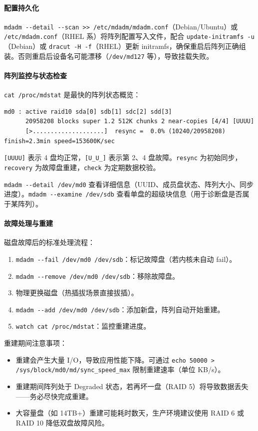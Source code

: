 \documentclass[12pt,UTF8]{ctexbook}
\begin{document}
\paragraph{配置持久化}

\verb|mdadm --detail --scan >> /etc/mdadm/mdadm.conf|（Debian/Ubuntu）或 \verb|/etc/mdadm.conf|（RHEL 系）将阵列配置写入文件，配合 \verb|update-initramfs -u|（Debian）或 \verb|dracut -H -f|（RHEL）更新 initramfs，确保重启后阵列正确组装。否则重启后设备名可能漂移（\verb|/dev/md127| 等），导致挂载失败。

\paragraph{阵列监控与状态检查}

\verb|cat /proc/mdstat| 是最快的阵列状态概览：
\begin{verbatim}
md0 : active raid10 sda[0] sdb[1] sdc[2] sdd[3]
      20958208 blocks super 1.2 512K chunks 2 near-copies [4/4] [UUUU]
      [>....................]  resync =  0.0% (10240/20958208) finish=2.3min speed=153600K/sec
\end{verbatim}
\verb|[UUUU]| 表示 4 盘均正常，\verb|[U_U_]| 表示第 2、4 盘故障。\verb|resync| 为初始同步，\verb|recovery| 为故障盘重建，\verb|check| 为定期数据校验。

\verb|mdadm --detail /dev/md0| 查看详细信息（UUID、成员盘状态、阵列大小、同步进度）。\verb|mdadm --examine /dev/sdb| 查看单盘的超级块信息（用于诊断盘是否属于某阵列）。

\paragraph{故障处理与重建}

磁盘故障后的标准处理流程：
\begin{enumerate}
	\item \verb|mdadm --fail /dev/md0 /dev/sdb|：标记故障盘（若内核未自动 fail）。
	\item \verb|mdadm --remove /dev/md0 /dev/sdb|：移除故障盘。
	\item 物理更换磁盘（热插拔场景直接拔插）。
	\item \verb|mdadm --add /dev/md0 /dev/sdb|：添加新盘，阵列自动开始重建。
	\item \verb|watch cat /proc/mdstat|：监控重建进度。
\end{enumerate}

重建期间注意事项：
\begin{itemize}
	\item 重建会产生大量 I/O，导致应用性能下降。可通过 \verb|echo 50000 > /sys/block/md0/md/sync_speed_max| 限制重建速率（单位 KB/s）。
	\item 重建期间阵列处于 Degraded 状态，若再坏一盘（RAID 5）将导致数据丢失——务必尽快完成重建。
	\item 大容量盘（如 14TB+）重建可能耗时数天，生产环境建议使用 RAID 6 或 RAID 10 降低双盘故障风险。
\end{itemize}
\end{document}

